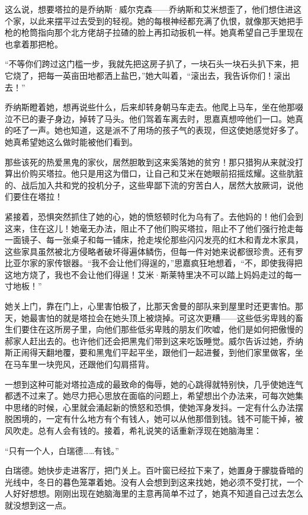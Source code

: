 \par 这么说，想要塔拉的是乔纳斯·威尔克森——乔纳斯和艾米想歪了，他们想住进这个家，以此来摆平过去受到的轻视。她的每根神经都充满了仇恨，就像那天她把手枪的枪筒指向那个北方佬胡子拉碴的脸上再扣动扳机一样。她真希望自己手里现在也拿着那把枪。
\par “不等你们跨过这门槛一步，我就先把这房子扒了，一块石头一块石头扒下来，把它烧了，把每一英亩田地都洒上盐巴，”她大叫着，“滚出去，我告诉你们！滚出去！”
\par 乔纳斯瞪着她，想再说些什么，后来却转身朝马车走去。他爬上马车，坐在他那啜泣不已的妻子身边，掉转了马头。他们驾着车离去时，思嘉真想啐他们一口。她真的呸了一声。她也知道，这是派不了用场的孩子气的表现，但这使她感觉好多了。她真希望她这么做时能被他们看到。
\par 那些该死的热爱黑鬼的家伙，居然胆敢到这来奚落她的贫穷！那只猎狗从来就没打算出价购买塔拉。他只是用这为借口，让自己和艾米在她眼前招摇炫耀。这些肮脏的、战后加入共和党的投机分子，这些卑鄙下流的穷苦白人，居然大放厥词，说他们要住在塔拉！
\par 紧接着，恐惧突然抓住了她的心，她的愤怒顿时化为乌有了。去他妈的！他们会到这来，住在这儿！她毫无办法，阻止不了他们购买塔拉，阻止不了他们强行抢走每一面镜子、每一张桌子和每一铺床，抢走埃伦那些闪闪发亮的红木和青龙木家具，这些家具虽然被北方侵略者破坏得遍体鳞伤，但每一件对她来说都很珍贵。还有罗比亚尔家的家传银器。“我不会让他们得逞的，”思嘉疯狂地想着，“不，即使我得把这地方烧了，我也不会让他们得逞！艾米·斯莱特里决不可以踏上妈妈走过的每一寸地板！”
\par 她关上门，靠在门上，心里害怕极了，比那天舍曼的部队来到屋里时还更害怕。那天，她最害怕的就是塔拉会在她头顶上被烧掉。可这次更糟——这些低劣卑贱的畜生们要住在这所房子里，向他们那些低劣卑贱的朋友们吹嘘，他们是如何把傲慢的郝家人赶出去的。也许他们还会把黑鬼们带到这来吃饭睡觉。威尔告诉过她，乔纳斯正闹得天翻地覆，要和黑鬼们平起平坐，跟他们一起进餐，到他们家里做客，坐在马车里一块兜风，还跟他们勾肩搭背。
\par 一想到这种可能对塔拉造成的最致命的侮辱，她的心跳得就特别快，几乎使她连气都透不过来了。她尽力把心思放在面临的问题上，希望想出个办法来，可每次她集中思绪的时候，心里就会涌起新的愤怒和恐惧，使她浑身发抖。一定有什么办法摆脱困境的，一定有什么地方有个有钱人，她可以从他那借到钱。钱不可能干掉，被风吹走。总有人会有钱的。接着，希礼说笑的话重新浮现在她脑海里：
\par “只有一个人，白瑞德……有钱。”
\par 白瑞德。她快步走进客厅，把门关上。百叶窗已经拉下来了，她置身于朦胧昏暗的光线中，冬日的暮色笼罩着她。没有人会想到到这来找她，她必须不受打扰，一个人好好想想。刚刚出现在她脑海里的主意再简单不过了，她真不知道自己过去怎么就没想到这一点。
